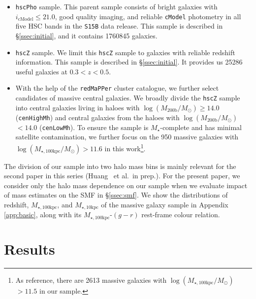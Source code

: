 \documentclass[fleqn,usenatbib]{mnras}
\def\etal{{\ et al.~}}
\def\redm{\texttt{redMaPPer}}
\def\rbcg{\texttt{cenHighMh}}
\def\nbcg{\texttt{cenLowMh}}
\def\mstar{{$M_{\star}$}}
\def\logmh{{$\log (M_{\mathrm{200b}}/M_{\odot})$}}
\def\minn{{$M_{\star,10\mathrm{kpc}}$}}
\def\mtot{{$M_{\star,100\mathrm{kpc}}$}}
\def\logmtot{{$\log (M_{\star,100\mathrm{kpc}}/M_{\odot})$}}
\begin{document}
    \begin{itemize}
        
        \item \texttt{hscPho} sample. This parent sample consists of bright galaxies 
            with $i_{\mathrm{cModel}} \leq 21.0$, good quality imaging, and reliable 
            \texttt{cModel} photometry in all five HSC bands in the \texttt{S15B} 
            data release. 
            This sample is described in \S \ref{ssec:initial}, and it contains 
            1760845 galaxies. 
            
        \item \texttt{hscZ} sample. We limit this \texttt{hscZ} sample to galaxies 
            with reliable redshift information.
            This sample is described in \S \ref{ssec:initial}. 
            It provides us 25286 useful galaxies at $0.3<z<0.5$.
            
        \item With the help of the \redm{} cluster catalogue, we further select 
            candidates of massive central galaxies.
            We broadly divide the \texttt{hscZ} sample into central galaxies living 
            in haloes with \logmh{}$\geq 14.0$ (\rbcg{}) and central galaxies from 
            the haloes with \logmh{}$<14.0$ (\nbcg{}).
            To ensure the sample is \mstar{}-complete and has minimal satellite 
            contamination, we further focus on the 950 massive galaxies with 
            \logmtot{}$>11.6$ in this work\footnote{As reference, there are 
            2613 massive galaxies with \logmtot{}$>11.5$ in our sample.}. 
           
    \end{itemize}
    
    The division of our sample into two halo mass bins is mainly relevant for the 
    second paper in this series (Huang \etal in prep.).  
    For the present paper, we consider only the halo mass dependence on our sample when 
    we evaluate impact of mass estimates on the SMF in \S \ref{ssec:smf}. 
    We show the distributions of redshift, \mtot{}, and \minn{} of the massive galaxy 
    sample in Appendix \ref{app:basic}, along with its \mtot{}-$(g-r)$ rest-frame 
    colour relation.



\section{Results}
    \label{sec:result}
\end{document}
